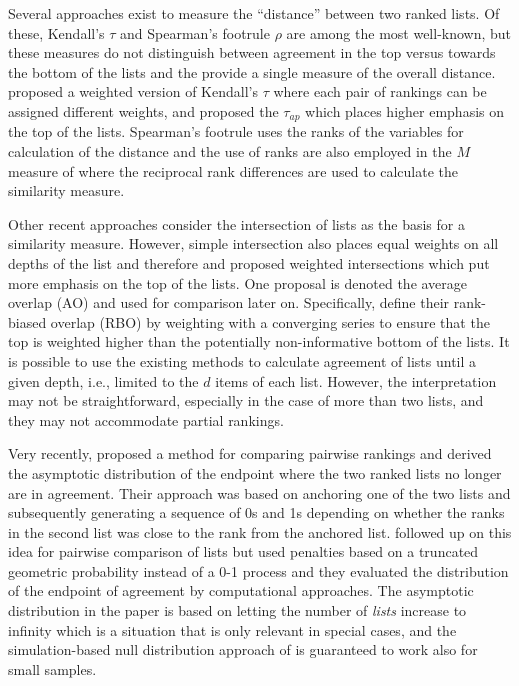 \documentclass[12pt,a4paper]{article}
\theoremstyle{plain}
\begin{document}
Several approaches exist to measure the ``distance'' between two
ranked lists. Of these, Kendall's $\tau$ \citep{kendall1948} and
Spearman’s footrule $\rho$ \citep{Spearman1910} are among the most
well-known, but these measures do not distinguish between agreement in
the top versus towards the bottom of the lists and the provide a
single measure of the overall distance. \citet{Shieh1998} proposed a
weighted version of Kendall's $\tau$ where each pair of rankings can
be assigned different weights, and \citet{Yilmaz2008} proposed the
$\tau_{ap}$ which places higher emphasis on the top of the lists.
Spearman’s footrule uses the ranks of the variables for calculation of
the distance and the use of ranks are also employed in the $M$ measure
of \citet{Bar-Ilan2006} where the reciprocal rank differences are used
to calculate the similarity measure.



Other recent approaches consider the intersection of lists as the basis
for a similarity measure. However, simple intersection also places
equal weights on all depths of the list and therefore \citet{Fagin2003} and
\citet{Webber2010} proposed weighted intersections which put more
emphasis on the top of the lists. One proposal is denoted the average
overlap (AO) and used for comparison later on. Specifically,
\citet{Webber2010} define their rank-biased overlap (RBO) by weighting
with a converging series to ensure that the top is weighted higher
than the potentially non-informative bottom of the lists.
It is possible to use the existing methods to calculate agreement of
lists until a given depth, i.e., limited to the $d$ items of each
list. However, the interpretation may not be straightforward,
especially in the case of more than two lists, and they may not
accommodate partial rankings.


Very recently, \citet{hall:schi:2012} proposed a method for comparing
pairwise rankings and derived the asymptotic distribution of the
endpoint where the two ranked lists no longer are in agreement. Their
approach was based on anchoring one of the two lists and subsequently
generating a sequence of 0s and 1s depending on whether the ranks in
the second list was close to the rank from the anchored
list. \citet{samp:verd:2013} followed up on this idea for pairwise
comparison of lists but used penalties based on a truncated geometric
probability instead of a 0-1 process and they evaluated the
distribution of the endpoint of agreement by computational approaches.
The asymptotic distribution in the \citet{hall:schi:2012} paper is
based on letting the number of \emph{lists} increase to infinity which
is a situation that is only relevant in special cases, and the
simulation-based null distribution approach of \citet{samp:verd:2013}
is guaranteed to work also for small samples.
\end{document}
